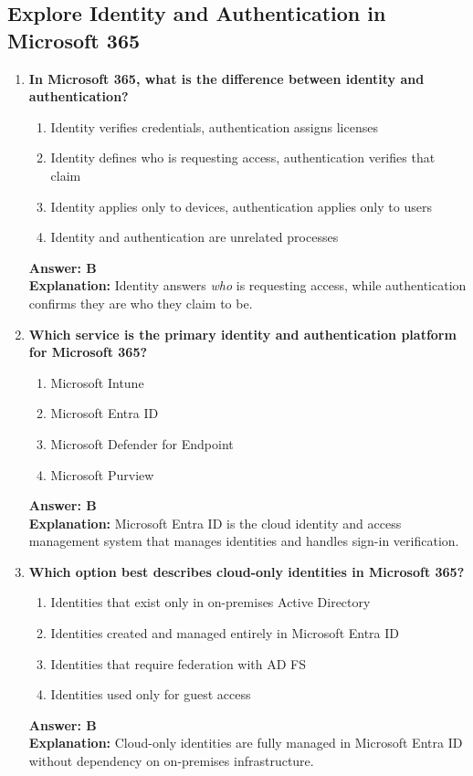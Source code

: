\documentclass[10pt]{article}
\begin{document}
\subsection{Explore Identity and Authentication in Microsoft 365}
\begin{enumerate}[leftmargin=*]

\item \textbf{In Microsoft 365, what is the difference between identity and authentication?}
\begin{enumerate}[label=\Alph*.]
  \item Identity verifies credentials, authentication assigns licenses
  \item Identity defines who is requesting access, authentication verifies that claim
  \item Identity applies only to devices, authentication applies only to users
  \item Identity and authentication are unrelated processes
\end{enumerate}
\textbf{Answer: B}\\
\textbf{Explanation:} Identity answers \emph{who} is requesting access, while authentication confirms they are who they claim to be.

\item \textbf{Which service is the primary identity and authentication platform for Microsoft 365?}
\begin{enumerate}[label=\Alph*.]
  \item Microsoft Intune
  \item Microsoft Entra ID
  \item Microsoft Defender for Endpoint
  \item Microsoft Purview
\end{enumerate}
\textbf{Answer: B}\\
\textbf{Explanation:} Microsoft Entra ID is the cloud identity and access management system that manages identities and handles sign-in verification.

\item \textbf{Which option best describes cloud-only identities in Microsoft 365?}
\begin{enumerate}[label=\Alph*.]
  \item Identities that exist only in on-premises Active Directory
  \item Identities created and managed entirely in Microsoft Entra ID
  \item Identities that require federation with AD FS
  \item Identities used only for guest access
\end{enumerate}
\textbf{Answer: B}\\
\textbf{Explanation:} Cloud-only identities are fully managed in Microsoft Entra ID without dependency on on-premises infrastructure.


\end{enumerate}
\end{document}
